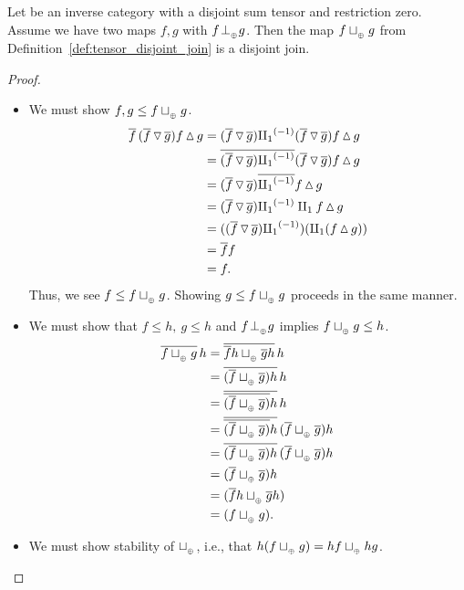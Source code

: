 \begin{proposition}\label{prop:disjointness_tensor_gives_disjoint_join}
  Let \X be an inverse category with a disjoint sum tensor and restriction zero. Assume we have two
  maps $f,g$ with $f\tperp g$. Then the map $f \tjoin g$ from
  Definition~\ref{def:tensor_disjoint_join} is a disjoint join.
\end{proposition}
\begin{proof}
  \begin{itemize}
    \item [\axiom{DJ}{1}] We must show $f, g \le f \tjoin g$.
      \begin{align*}
        \rst{f}\,(\rst{f}\tjdown\rst{g})  f\tjup g
          &= (\rst{f}\tjdown\rst{g}) \icpa (\rst{f}\tjdown\rst{g} ) f\tjup g \\
        &=\rst{(\rst{f}\tjdown\rst{g}) \icpa} (\rst{f}\tjdown\rst{g}) f\tjup g  \\
        &=(\rst{f}\tjdown\rst{g}) \rst{\icpa} f\tjup g  \\
        &=(\rst{f}\tjdown\rst{g}) \icpa \cpa f\tjup g \\
        &=((\rst{f}\tjdown\rst{g}) \icpa) (\cpa (f \tjup g)) \\
        &= \rst{f} f \\
        &=f.
      \end{align*}
      Thus, we see $f \le f \tjoin g$. Showing $g \le f \tjoin g$ proceeds in the same manner.
    \item [\axiom{DJ}{2}] We must show that $f \le h,\ g\le h$ and $f\tperp g$ implies
      $f \tjoin g \le h$.
      \begin{align*}
        \rst{f \tjoin g} \,h & = \rst{\rst{f} h \tjoin \rst{g} h} \,h\\
        & = \rst{(\rst{f} \tjoin \rst{g})h} \,h\\
        & = \rst{\rst{(\rst{f} \tjoin \rst{g})}h} \,h\\
        & = \rst{\rst{(\rst{f} \tjoin \rst{g})}h}\,(\rst{f} \tjoin \rst{g})h\\
        & = \rst{(\rst{f} \tjoin \rst{g})h}\,(\rst{f} \tjoin \rst{g})h\\
        & = (\rst{f}\tjoin \rst{g})h\\
        & = (\rst{f}h\tjoin \rst{g}h)\\
        & = (f\tjoin g).
      \end{align*}
    \item [\axiom{DJ}{3}] We must show stability of $\tjoin$, i.e., that
      $h(f\tjoin g) = h f \tjoin h g$.


\end{itemize}
\end{proof}
